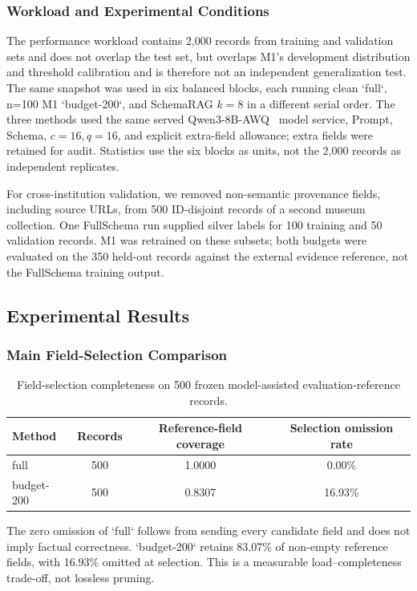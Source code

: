 \documentclass[runningheads]{llncs}
\newcommand{\method}{M1}
\newcommand{\full}{FullSchema}
\newcommand{\schemarag}{SchemaRAG}
\begin{document}
\subsubsection{Workload and Experimental Conditions}

The performance workload contains 2,000 records from training and validation sets and does not overlap the test set, but overlaps \method{}'s development distribution and threshold calibration and is therefore not an independent generalization test. The same snapshot was used in six balanced blocks, each running clean `full`, n=100 M1 `budget-200`, and \schemarag{} $k=8$ in a different serial order. The three methods used the same served Qwen3-8B-AWQ~\cite{yang2025qwen3} model service, Prompt, Schema, $c=16,q=16$, and explicit extra-field allowance; extra fields were retained for audit. Statistics use the six blocks as units, not the 2,000 records as independent replicates.

For cross-institution validation, we removed non-semantic provenance fields, including source URLs, from 500 ID-disjoint records of a second museum collection. One \full{} run supplied silver labels for 100 training and 50 validation records. M1 was retrained on these subsets; both budgets were evaluated on the 350 held-out records against the external evidence reference, not the \full{} training output.

\subsection{Experimental Results}
\subsubsection{Main Field-Selection Comparison}

\begin{table}[htbp]\centering\small
\caption{Field-selection completeness on 500 frozen model-assisted evaluation-reference records.}\label{tab:coverage}
\begin{tabular*}{\linewidth}{@{\extracolsep{\fill}}lccc@{}}\toprule
Method & Records & Reference-field coverage & Selection omission rate\\\midrule
full & 500 & 1.0000 & 0.00\%\\
budget-200 & 500 & 0.8307 & 16.93\%\\\bottomrule
\end{tabular*}\end{table}

The zero omission of `full` follows from sending every candidate field and does not imply factual correctness. `budget-200` retains 83.07\% of non-empty reference fields, with 16.93\% omitted at selection. This is a measurable load--completeness trade-off, not lossless pruning.
\end{document}
